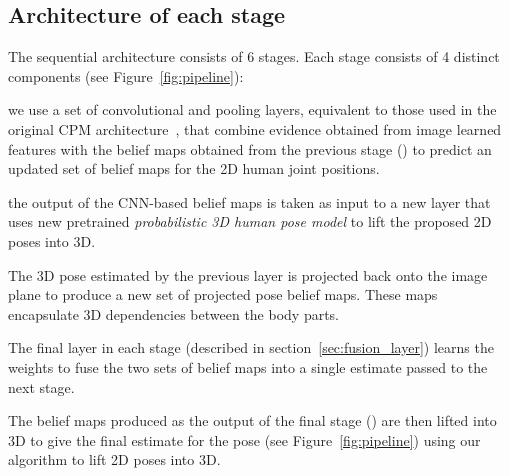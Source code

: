 \documentclass[10pt,twocolumn,letterpaper]{article}
\begin{document}
\subsection{Architecture of each stage}
The sequential architecture consists of 6 stages. Each stage consists of 4
distinct components (see Figure~\ref{fig:pipeline}):

 we use a set of
convolutional and pooling layers, equivalent to those used in the
original CPM architecture~\cite{wei2016convolutional}, that combine
evidence obtained from image learned features with the belief maps
obtained from the previous stage () to predict an updated set of
belief maps for the 2D human joint positions.


 the output of the
CNN-based belief maps is taken as input to a new layer that uses new
pretrained \emph{probabilistic 3D human pose model} to lift the
proposed 2D poses into 3D. 

 The 3D pose estimated by
the previous layer is projected back onto the image plane to produce a
new set of projected pose belief maps. These maps encapsulate 3D
dependencies between the body parts. 

 The final layer in each stage (described in
section~\ref{sec:fusion_layer}) learns the weights to fuse the two sets of
belief maps into a single estimate passed to the next stage.

 The belief maps produced as the output of the
final stage () are then lifted into 3D to give the final estimate for the
pose (see Figure~\ref{fig:pipeline}) using our algorithm to lift 2D poses into
3D.
\end{document}

